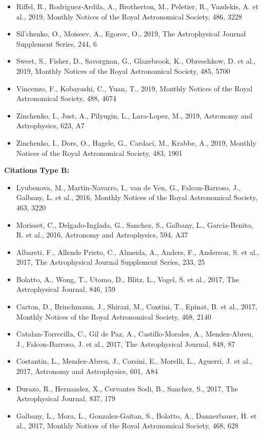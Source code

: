 \documentclass{letter}
\begin{document}
\begin{enumerate}
\begin{itemize}
\item Riffel, R., Rodriguez-Ardila, A., Brotherton, M., Peletier, R., Vazdekis, A. et al., 2019, Monthly Notices of the Royal Astronomical Society, 486, 3228
\item Sil'chenko, O., Moiseev, A., Egorov, O., 2019, The Astrophysical Journal Supplement Series, 244, 6
\item Sweet, S., Fisher, D., Savorgnan, G., Glazebrook, K., Obreschkow, D. et al., 2019, Monthly Notices of the Royal Astronomical Society, 485, 5700
\item Vincenzo, F., Kobayashi, C., Yuan, T., 2019, Monthly Notices of the Royal Astronomical Society, 488, 4674
\item Zinchenko, I., Just, A., Pilyugin, L., Lara-Lopez, M., 2019, Astronomy and Astrophysics, 623, A7
\item Zinchenko, I., Dors, O., Hagele, G., Cardaci, M., Krabbe, A., 2019, Monthly Notices of the Royal Astronomical Society, 483, 1901
\end{itemize}
{\bf Citations Type B:}
\begin{itemize}
\item Lyubenova, M., Martin-Navarro, I., van de Ven, G., Falcon-Barroso, J., Galbany, L. et al., 2016, Monthly Notices of the Royal Astronomical Society, 463, 3220
\item Morisset, C., Delgado-Inglada, G., Sanchez, S., Galbany, L., Garcia-Benito, R. et al., 2016, Astronomy and Astrophysics, 594, A37
\item Albareti, F., Allende Prieto, C., Almeida, A., Anders, F., Anderson, S. et al., 2017, The Astrophysical Journal Supplement Series, 233, 25
\item Bolatto, A., Wong, T., Utomo, D., Blitz, L., Vogel, S. et al., 2017, The Astrophysical Journal, 846, 159
\item Carton, D., Brinchmann, J., Shirazi, M., Contini, T., Epinat, B. et al., 2017, Monthly Notices of the Royal Astronomical Society, 468, 2140
\item Catalan-Torrecilla, C., Gil de Paz, A., Castillo-Morales, A., Mendez-Abreu, J., Falcon-Barroso, J. et al., 2017, The Astrophysical Journal, 848, 87
\item Costantin, L., Mendez-Abreu, J., Corsini, E., Morelli, L., Aguerri, J. et al., 2017, Astronomy and Astrophysics, 601, A84
\item Durazo, R., Hernandez, X., Cervantes Sodi, B., Sanchez, S., 2017, The Astrophysical Journal, 837, 179
\item Galbany, L., Mora, L., Gonzalez-Gaitan, S., Bolatto, A., Dannerbauer, H. et al., 2017, Monthly Notices of the Royal Astronomical Society, 468, 628

\end{itemize}
\end{enumerate}
\end{document}

